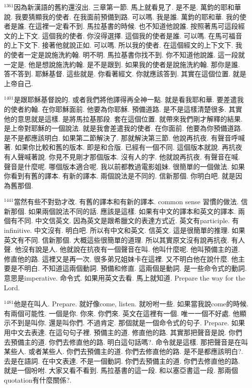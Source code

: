 \documentclass{book}
\begin{document}
$^{1361}$因為新漢語的舊約還沒出.
三章第一節.
馬上就看見了.
是不是.
萬鈞的耶和華說.
我要猜顯我的使者.
在我面前預備到路.
可以嗎.
我是誰.
萬鈞的耶和華.
我的使者是誰.
在這裡一定看不到.
馬拉基書的時候.
也不知道他說誰.
按照著馬可這段經文的上下文.
這個我的使者.
你沒得選擇.
這個我的使者是誰.
可以嗎.
在馬可福音的上下文下.
接著他就說正如.
可以嗎.
所以我的使者.
在這個經文的上下文下.
我的使者一定是說施洗約翰.
明不明.
馬拉基書你找不到.
你不知道他說誰.
這一段就一定是.
他是想說施洗約翰.
是不是跟到.
如果我的使者是說施洗約翰.
那你是誰.
答不答到.
耶穌基督.
這些就是.
你看著經文.
你就應該答到.
其實在這個位置.
就是上帝自己.

$^{1401}$是跟耶穌基督說的.
或者我們將他譯得再全神一點.
就是看我耶和華.
要差遣我的使者約翰.
在你耶穌面前.
他要為你耶穌.
預備道路.
是不是這樣清楚很多.
其實他的意思就是這樣.
是將馬拉基那段.
套在這個位置.
就帶來我們剛才解釋的結果.
是上帝對耶穌的一個說法.
就是我會差遣我的使者.
在你面前.
他要為你預備道路.
是不是都應該明白.
如果第二節解決了.
那就解決第三節.
他說再抗夜.
有聲音呼喊著.
如果你比較和舊的版本.
即是和合版.
已經有一個不同.
這個版本就說.
再抗夜有人聲喊著說.
你見不見剛才那個版本.
沒有人的字.
他就說再抗夜.
有聲音在喊.
聲音是什麼呢.
哪個版本適合呢.
我以前都教過電影姐妹.
很簡單的一個做法.
如果你看到有舊的譯本.
有新的譯本.
兩個說法是不同的.
信新那個.
你明白吧.
就是因為舊那個.

$^{1441}$當然有些不對勁才改.
有舊的譯本和有新的譯本.
common sense 習慣的做法.
信新那個.
如果兩個說法不同的話.
應該是這樣.
如果有中文的譯本和英文的譯本.
兩個有不同.
中文信英文.
因為英文是跟希臘文的表達方式近.
英文有participle.
有infinitive.
中文沒有.
明白吧.
所以有中文和英文.
信英文.
這是很簡單的推理.
如果英文有不同.
信新那個.
大概這些很簡單的道理.
所以其實原文沒有說再抗夜.
有人聲.
他沒有說是人.
他就說在抗夜有一個聲音在叫.
他叫什麼呢.
他叫預備主的道.
修直他的路.
這裡又是再一次.
很多弟兄姐妹卡在這裡.
又不明白他在說什麼.
他主要是不明白.
不知道這兩個動詞.
預備和修直.
這兩個是動詞.
是一些命令式的動詞.
意思是imperative.
命令式.
如果用英文去看.
馬上就知道.
Prepare the way for the Lord.

$^{1481}$他是在叫人.
Prepare.
就好像come, listen.
就吩咐一些.
如果當我說come的時候.
有兩個可能性.
一個是你.
你來.
你們來.
英文在這裡有一個.
唯一一個不好處.
他顯示不到是叫你.
還是叫你們.
不過肯定.
那個就是一個命令式的句子.
Prepare.
如果用中文去表達.
在這句句子裡.
預備主的道.
修直他的路.
其實那把聲音是說.
你們去預備主的道.
你們去修直他的路.
明白這句話嗎?.
命令就是這樣.
那把聲音是在叫某些人.
或者某些人.
你們去預備主的道.
你們去修直他的路.
是不是都應該明白?.
去是在語詞.
在中文表達.
不是一個動詞.
你們去預備主的道.
你們去修直他的路.
就是一個吩咐.
大家又看不看到.
馬拉基書的這一段.
和以塞亞書這一段.
那兩個quotation有什麼關係?.
\end{document}
